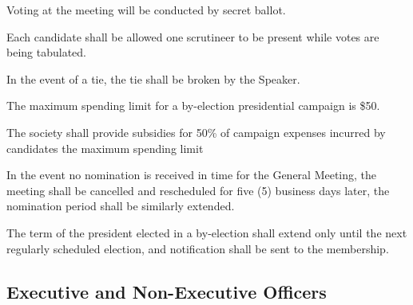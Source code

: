 \begin{longenum}[ label*=\thesubsection.\arabic*., align=left]
	\item Voting at the meeting will be conducted by secret ballot.
	\item Each candidate shall be allowed one scrutineer to be present while votes are being tabulated.
	\item In the event of a tie, the tie shall be broken by the Speaker.
	\item The maximum spending limit for a by-election presidential campaign is \$50.
	\item The society shall provide subsidies for 50\% of campaign expenses incurred by candidates the maximum spending limit
	\item In the event no nomination is received in time for the General Meeting, the meeting shall be cancelled and rescheduled for five (5) business days later, the nomination period shall be similarly extended.
	\item The term of the president elected in a by-election shall extend only until the next regularly scheduled election, and notification shall be sent to the membership.
\end{longenum}

\subsection{Executive and Non-Executive Officers}

